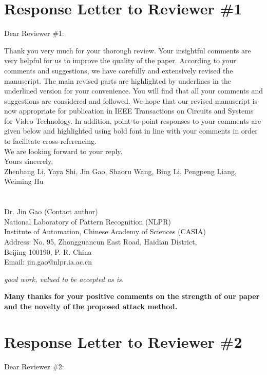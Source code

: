 \documentclass[12pt]{article}
\begin{document}
\newpage
{\centering\section*{Response Letter to Reviewer \#1}}
\noindent Dear Reviewer \#1:

Thank you very much for your thorough review. Your insightful comments are very helpful for us to improve the quality of the paper. According to your comments and suggestions, we have carefully and extensively revised the manuscript. The main revised parts are highlighted by underlines in the underlined version for your convenience. You will find that all your comments and suggestions are considered and followed. We hope that our revised manuscript is now appropriate for publication in IEEE Transactions on Circuits and Systems for Video Technology.
In addition, point-to-point responses to your comments are given below and highlighted using bold font in line with your comments in order to facilitate cross-referencing.\\[10pt]
\indent We are looking forward to your reply.\\[10pt]
\noindent Yours sincerely,\\
\noindent Zhenbang Li, Yaya Shi, Jin Gao, Shaoru Wang, Bing Li, Pengpeng Liang, Weiming Hu
\\
\\
\\
\noindent Dr. Jin Gao (Contact author)\\
\noindent National Laboratory of Pattern Recognition (NLPR)\\
\noindent Institute of Automation, Chinese Academy of Sciences (CASIA)\\
\noindent Address: No. 95, Zhongguancun East Road, Haidian District,\\
\noindent Beijing 100190, P. R. China\\
\noindent Email: jin.gao@nlpr.ia.ac.cn

\newpage
\textit{good work, valued to be accepted as is.}

\textbf{Many thanks for your positive comments on the strength of our paper and the novelty of the proposed attack method.}

\newpage
{\centering\section*{Response Letter to Reviewer \#2}}
\noindent Dear Reviewer \#2:
\end{document}

